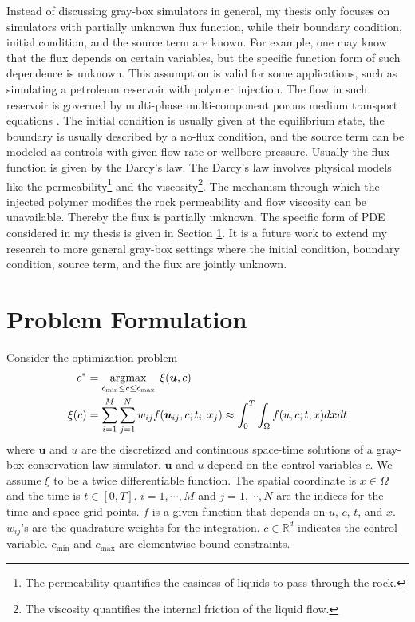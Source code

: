 Instead of discussing gray-box simulators in general, my thesis only focuses on
simulators with partially unknown flux function, while their boundary condition,
initial condition, and the source term are known. For example, one may know that
the flux depends on certain variables, but the specific function form of such dependence is unknown.
This assumption is valid for some applications,
such as simulating a petroleum reservoir with polymer injection.
The flow in such reservoir is governed by multi-phase multi-component porous medium transport 
equations \cite{reservoir sim book}. The initial condition is usually given at the equilibrium state, the boundary
is usually described by a no-flux condition, and the source term can be modeled as controls
with given flow rate or wellbore pressure.
Usually the flux function is given by the Darcy's law.
The Darcy's law involves physical models like the permeability\footnote{The permeability quantifies the
easiness of liquids to pass through the rock.} and the viscosity\footnote{The viscosity quantifies the
internal friction of the liquid flow.}.
The mechanism through which the injected polymer modifies the rock permeability and flow viscosity can be unavailable. Thereby the flux is partially unknown.
The specific form of PDE considered in my thesis is given in Section \ref{sec: formulation}.
It is a future work to extend my research to more general gray-box settings where
the initial condition, boundary condition, source term, and the flux are jointly unknown.\\

\section{Problem Formulation}
\label{sec: formulation}
Consider the optimization problem
\begin{equation}\begin{split}
    c^* &= \argmax_{c_{\min}\le  c \le c_{\max}}\; \xi(\boldsymbol{u},c) \\
    \xi(c) &= \sum_{i=1}^M \sum_{j=1}^N w_{ij} f(\boldsymbol{u}_{ij},c; t_i,x_j)
    \approx \int_0^T \int_\Omega f(u,c; t,x)d\boldsymbol{x} d t%
    \label{eqn: objective prototype}
\end{split}\end{equation}
where $\boldsymbol{u}$ and $u$ are the discretized and continuous 
space-time solutions of a gray-box conservation law
simulator.  $\boldsymbol{u}$ and $u$ depend on the control variables $c$. 
We assume $\xi$ to be a twice differentiable function.
The spatial coordinate is $x \in \Omega$ and the time is $t\in[0,T]$.
$i=1,\cdots, M$ and $j=1,\cdots, N$ are the indices for the time and space grid points.
$f$ is a given function that depends on $u$, $c$, $t$, and $x$.
$w_{ij}$'s are the quadrature weights for the integration.
$c\in\mathbb{R}^d$ indicates the control variable. 
$c_{\min}$ and $c_{\max}$ are elementwise bound constraints.\\

